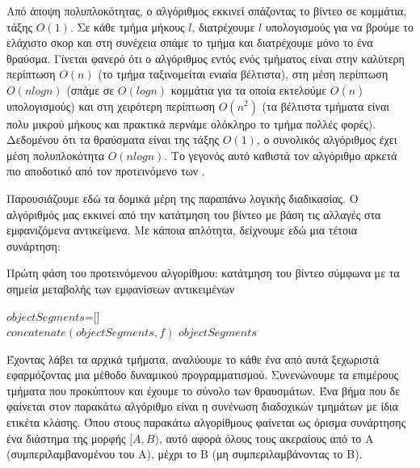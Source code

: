 \documentclass[11pt,a4paper,english,greek,twoside]{../Thesis}
\begin{document}
\par Από άποψη πολυπλοκότητας, ο αλγόριθμος εκκινεί σπάζοντας το βίντεο σε κομμάτια, τάξης $O(1)$. Σε κάθε τμήμα μήκους $l$, διατρέχουμε $l$ υπολογισμούς για να βρούμε το ελάχιστο σκορ και στη συνέχεια σπάμε το τμήμα και διατρέχουμε μόνο το ένα θραύσμα. Γίνεται φανερό ότι ο αλγόριθμος εντός ενός τμήματος είναι στην καλύτερη περίπτωση $O(n)$ (το τμήμα ταξινομείται ενιαία βέλτιστα), στη μέση περίπτωση $O(nlogn)$ (σπάμε σε $O(logn)$ κομμάτια για τα οποία εκτελούμε $O(n)$ υπολογισμούς) και στη χειρότερη περίπτωση $O(n^2)$ (τα βέλτιστα τμήματα είναι πολυ μικρού μήκους και πρακτικά περνάμε ολόκληρο το τμήμα πολλές φορές). Δεδομένου ότι τα θραύσματα είναι της τάξης $O(1)$, ο συνολικός αλγόριθμος έχει μέση πολυπλοκότητα $O(nlogn)$. Το γεγονός αυτό καθιστά τον αλγόριθμο αρκετά πιο αποδοτικό από τον προτεινόμενο των \cite{hoai_2011}.

\par Παρουσιάζουμε εδώ τα δομικά μέρη της παραπάνω λογικής διαδικασίας. Ο αλγόριθμός μας εκκινεί από την κατάτμηση του βίντεο με βάση τις αλλαγές στα εμφανιζόμενα αντικείμενα. Με κάποια απλότητα, δείχνουμε εδώ μια τέτοια συνάρτηση:

\begin{algorithm}[H]
	\caption{Πρώτη φάση του προτεινόμενου αλγορίθμου: κατάτμηση του βίντεο σύμφωνα με τα σημεία μεταβολής των εμφανίσεων αντικειμένων}
	\label{alg:ObjSeg}
	\begin{algorithmic}
	  \State $objectSegments$=[]
	  \\
		  \State $concatenate(objectSegments, f)$
		\EndIf
	  \EndFor
	  \State \Return $objectSegments$
	  \EndFunction
	\end{algorithmic}
\end{algorithm}

\par Έχοντας λάβει τα αρχικά τμήματα, αναλύουμε το κάθε ένα από αυτά ξεχωριστά εφαρμόζοντας μια μέθοδο δυναμικού προγραμματισμού. Συνενώνουμε τα επιμέρους τμήματα που προκύπτουν και έχουμε το σύνολο των θραυσμάτων. Ένα βήμα που δε φαίνεται στον παρακάτω αλγόριθμο είναι η συνένωση διαδοχικών τμημάτων με ίδια ετικέτα κλάσης. Όπου στους παρακάτω αλγορίθμους φαίνεται ως όρισμα συνάρτησης ένα διάστημα της μορφής $[A,B)$, αυτό αφορά όλους τους ακεραίους από το Α (συμπεριλαμβανομένου του Α), μέχρι το Β (μη συμπεριλαμβάνοντας το Β).
\end{document}
